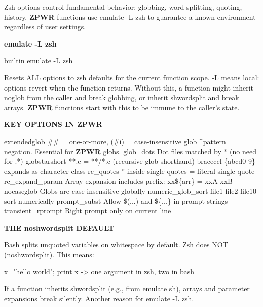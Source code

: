 \documentclass[11pt,a4paper,twoside]{book}
\begin{document}
Zsh options control fundamental behavior: globbing, word splitting, quoting, history. \textbf{ZPWR} functions use emulate -L zsh to guarantee a known environment regardless of user settings.


\vspace{12pt}
{\bfseries\color{neonyellow} emulate -L zsh}\vspace{4pt}

\begin{codebox}
\color{neongreen}builtin emulate -L zsh\\
\end{codebox}

Resets ALL options to zsh defaults for the current function scope. -L means local: options revert when the function returns. Without this, a function might inherit noglob from the caller and break globbing, or inherit shwordsplit and break arrays. \textbf{ZPWR} functions start with this to be immune to the caller's state.


\vspace{12pt}
{\bfseries\color{neonyellow} KEY OPTIONS IN \textbf{ZPWR}}\vspace{4pt}

extendedglob      \#\# = one-or-more, (\#i) = case-insensitive glob \textasciicircum{}pattern = negation. Essential for \textbf{ZPWR} globs. glob\_dots         Dot files matched by * (no need for .*) globstarshort     **.c = **/*.c (recursive glob shorthand) braceccl          \{abcd0-9\} expands as character class rc\_quotes         '' inside single quotes = literal single quote rc\_expand\_param   Array expansion includes prefix: xx\$\{arr\} = xxA xxB nocaseglob        Globs are case-insensitive globally numeric\_glob\_sort  file1 file2 file10 sort numerically prompt\_subst       Allow \$(...) and \$\{...\} in prompt strings transient\_rprompt  Right prompt only on current line


\vspace{12pt}
{\bfseries\color{neonyellow} THE noshwordsplit DEFAULT}\vspace{4pt}

Bash splits unquoted variables on whitespace by default. Zsh does NOT (noshwordsplit). This means:

\begin{codebox}
\color{neongreen}x="hello world"; print x  -> one argument in zsh, two in bash\\
\end{codebox}

If a function inherits shwordsplit (e.g., from emulate sh), arrays and parameter expansions break silently. Another reason for emulate -L zsh.
\end{document}
